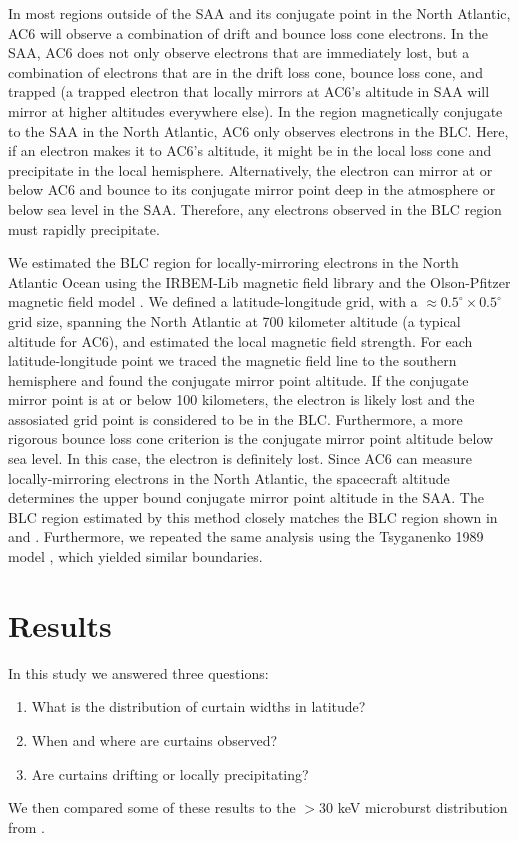 \documentclass[draft]{agujournal2019}
\begin{document}
In most regions outside of the SAA and its conjugate point in the North Atlantic, AC6 will observe a combination of drift and bounce loss cone electrons. In the SAA, AC6 does not only observe electrons that are immediately lost, but a combination of electrons that are in the drift loss cone, bounce loss cone, and trapped (a trapped electron that locally mirrors at AC6's altitude in SAA will mirror at higher altitudes everywhere else). In the region magnetically conjugate to the SAA in the North Atlantic, AC6 only observes electrons in the BLC. Here, if an electron makes it to AC6's altitude, it might be in the local loss cone and precipitate in the local hemisphere. Alternatively, the electron can mirror at or below AC6 and bounce to its conjugate mirror point deep in the atmosphere or below sea level in the SAA. Therefore, any electrons observed in the BLC region must rapidly precipitate. 

We estimated the BLC region for locally-mirroring electrons in the North Atlantic Ocean using the IRBEM-Lib magnetic field library and the Olson-Pfitzer magnetic field model \cite{irbem, Olson1982}. We defined a latitude-longitude grid, with a $\approx 0.5^\circ \times 0.5^\circ$ grid size, spanning the North Atlantic at 700 kilometer altitude (a typical altitude for AC6), and estimated the local magnetic field strength. For each latitude-longitude point we traced the magnetic field line to the southern hemisphere and found the conjugate mirror point altitude. If the conjugate mirror point is at or below 100 kilometers, the electron is likely lost and the assosiated grid point is considered to be in the BLC. Furthermore, a more rigorous bounce loss cone criterion is the conjugate mirror point altitude below sea level. In this case, the electron is definitely lost. Since AC6 can measure locally-mirroring electrons in the North Atlantic, the spacecraft altitude determines the upper bound conjugate mirror point altitude in the SAA. The BLC region estimated by this method closely matches the BLC region shown in  and . Furthermore, we repeated the same analysis using the Tsyganenko 1989 model \cite{Tsyganenko1989}, which yielded similar boundaries.

\section{Results} \label{results}
In this study we answered three questions:

\begin{enumerate}
\item What is the distribution of curtain widths in latitude?
\item When and where are curtains observed?
\item Are curtains drifting or locally precipitating?
\end{enumerate} We then compared some of these results to the $>30$ keV microburst distribution from .
\end{document}
